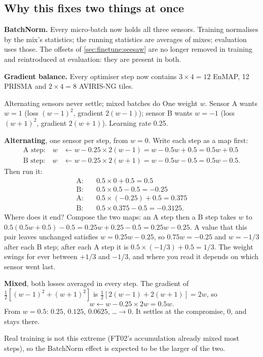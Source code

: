 \subsection{Why this fixes two things at once}

\textbf{BatchNorm.} Every micro-batch now holds all three sensors. Training normalises by the mix's statistics; the running statistics are averages of mixes;
evaluation uses those. The offsets of \cref{sec:finetune:seesaw} are no longer removed in training and reintroduced at evaluation: they are present in both.

\textbf{Gradient balance.} Every optimiser step now contains $3 \times 4 = 12$ EnMAP, 12 PRISMA and $2 \times 4 = 8$ AVIRIS-NG tiles.

\begin{worked}[label={we:finetune:toy}]{Alternating sensors never settle; mixed batches do}
One weight $w$. Sensor A wants $w = 1$ (loss $(w - 1)^2$, gradient $2(w - 1)$); sensor B wants $w = -1$ (loss $(w + 1)^2$, gradient $2(w + 1)$). Learning rate 0.25.

\textbf{Alternating}, one sensor per step, from $w = 0$. Write each step as a map first:
\begin{align*}
  \text{A step:}\quad w &\leftarrow w - 0.25 \times 2(w - 1) = w - 0.5w + 0.5 = 0.5w + 0.5\\
  \text{B step:}\quad w &\leftarrow w - 0.25 \times 2(w + 1) = w - 0.5w - 0.5 = 0.5w - 0.5.
\end{align*}
Then run it:
\begin{align*}
  \text{A:}&\quad 0.5 \times 0 + 0.5 = 0.5\\
  \text{B:}&\quad 0.5 \times 0.5 - 0.5 = -0.25\\
  \text{A:}&\quad 0.5 \times (-0.25) + 0.5 = 0.375\\
  \text{B:}&\quad 0.5 \times 0.375 - 0.5 = -0.3125.
\end{align*}
Where does it end? Compose the two maps: an A step then a B step takes $w$ to $0.5(0.5w + 0.5) - 0.5 = 0.25w + 0.25 - 0.5 = 0.25w - 0.25$. A value that
this pair leaves unchanged satisfies $w = 0.25w - 0.25$, so $0.75w = -0.25$ and $w = -1/3$ after each B step; after each A step it is
$0.5 \times (-1/3) + 0.5 = 1/3$. The weight swings for ever between $+1/3$ and $-1/3$, and where you read it depends on which sensor went last.

\textbf{Mixed}, both losses averaged in every step. The gradient of $\tfrac{1}{2}[(w-1)^2 + (w+1)^2]$ is $\tfrac{1}{2}[2(w - 1) + 2(w + 1)] = 2w$, so
\[
  w \leftarrow w - 0.25 \times 2w = 0.5w.
\]
From $w = 0.5$: $0.25$, $0.125$, $0.0625$, \dots $\to 0$. It settles at the compromise, 0, and stays there.
\end{worked}
Real training is not this extreme (FT02's accumulation already mixed most steps), so the BatchNorm effect is expected to be the larger of the two.

